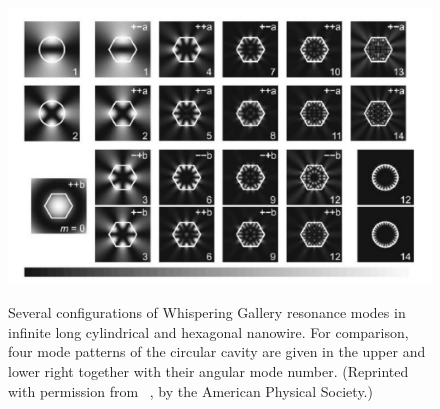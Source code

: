 \begin{figure}
  \caption{Several configurations of Whispering Gallery resonance modes in infinite long cylindrical and hexagonal nanowire. For comparison, four mode patterns of the circular cavity are given in the upper and lower right together with their angular mode number. (Reprinted with permission from~\cite{Nobis:2005wg} ,  by the American Physical Society.)}
  \centering
  \includegraphics[width=\textwidth]{pictures/LM/WGMode}
  \label{WGMode}
\end{figure}

